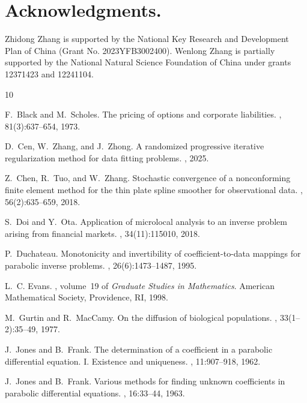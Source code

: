 \documentclass[11pt]{article}
\numberwithin{equation}{section}
\begin{document}
\section*{Acknowledgments.}
Zhidong Zhang is supported by the National Key Research and Development Plan of China (Grant No. 2023YFB3002400). Wenlong Zhang is partially supported by the National Natural Science Foundation
of China under grants 12371423 and 12241104.



\begin{thebibliography}{10}

F.~Black and M.~Scholes.
\newblock The pricing of options and corporate liabilities.
, 81(3):637--654, 1973.

D.~Cen, W.~Zhang, and J.~Zhong.
\newblock A randomized progressive iterative regularization method for data
  fitting problems.
, 2025.

Z.~Chen, R.~Tuo, and W.~Zhang.
\newblock Stochastic convergence of a nonconforming finite element method for
  the thin plate spline smoother for observational data.
, 56(2):635--659, 2018.

S.~Doi and Y.~Ota.
\newblock Application of microlocal analysis to an inverse problem arising from
  financial markets.
, 34(11):115010, 2018.

P.~Duchateau.
\newblock Monotonicity and invertibility of coefficient-to-data mappings for
  parabolic inverse problems.
, 26(6):1473--1487, 1995.

L.~C. Evans.
, volume~19 of {\em Graduate
  Studies in Mathematics}.
\newblock American Mathematical Society, Providence, RI, 1998.

M.~Gurtin and R.~MacCamy.
\newblock On the diffusion of biological populations.
, 33(1--2):35--49, 1977.

J.~Jones and B.~Frank.
\newblock The determination of a coefficient in a parabolic differential
  equation. {I}. {E}xistence and uniqueness.
, 11:907--918, 1962.

J.~Jones and B.~Frank.
\newblock Various methods for finding unknown coefficients in parabolic
  differential equations.
, 16:33--44, 1963.


\end{thebibliography}
\end{document}
